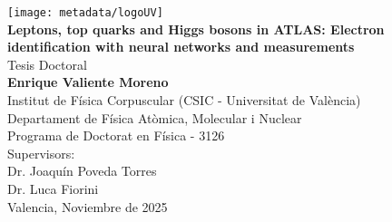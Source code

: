 \begin{titlepage}
    \begin{center}
        \vspace*{1cm} 
        \texttt{[image: metadata/logoUV]}\\[15mm]

        {\Large{\textbf{Leptons, top quarks and Higgs bosons in ATLAS: Electron identification with neural networks and \ttH measurements}}}\\[15mm]

        Tesis Doctoral\\
        {\large{\textbf{Enrique Valiente Moreno}}}\\[15mm]

        Institut de Física Corpuscular (CSIC - Universitat de València)\\
        Departament de Física Atòmica, Molecular i Nuclear\\
        Programa de Doctorat en Física - 3126\\[15mm]

        Supervisors:\\
        Dr. Joaquín Poveda Torres\\
        Dr. Luca Fiorini\\[15mm]

        Valencia, Noviembre de 2025
    \end{center}

\end{titlepage}